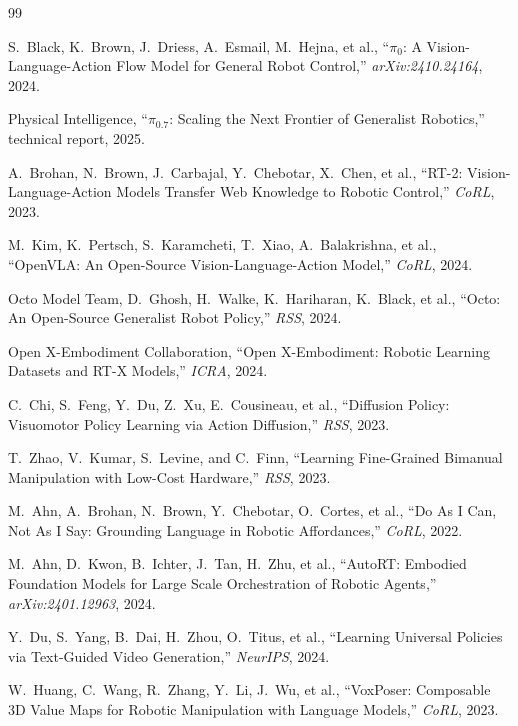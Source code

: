\documentclass[11pt,a4paper]{article}
\begin{document}
\begin{thebibliography}{99}

 S.~Black, K.~Brown, J.~Driess, A.~Esmail, M.~Hejna, et al.,
``$\pi_0$: A Vision-Language-Action Flow Model for General Robot Control,''
\emph{arXiv:2410.24164}, 2024.

 Physical Intelligence, ``$\pi_0.7$: Scaling the Next Frontier of
Generalist Robotics,'' technical report, 2025.

 A.~Brohan, N.~Brown, J.~Carbajal, Y.~Chebotar, X.~Chen, et al.,
``RT-2: Vision-Language-Action Models Transfer Web Knowledge to Robotic
Control,'' \emph{CoRL}, 2023.

 M.~Kim, K.~Pertsch, S.~Karamcheti, T.~Xiao, A.~Balakrishna,
et al., ``OpenVLA: An Open-Source Vision-Language-Action Model,'' \emph{CoRL},
2024.

 Octo Model Team, D.~Ghosh, H.~Walke, K.~Hariharan, K.~Black,
et al., ``Octo: An Open-Source Generalist Robot Policy,'' \emph{RSS}, 2024.

 Open X-Embodiment Collaboration, ``Open X-Embodiment: Robotic
Learning Datasets and RT-X Models,'' \emph{ICRA}, 2024.

 C.~Chi, S.~Feng, Y.~Du, Z.~Xu, E.~Cousineau, et al.,
``Diffusion Policy: Visuomotor Policy Learning via Action Diffusion,''
\emph{RSS}, 2023.

 T.~Zhao, V.~Kumar, S.~Levine, and C.~Finn, ``Learning Fine-Grained
Bimanual Manipulation with Low-Cost Hardware,'' \emph{RSS}, 2023.

 M.~Ahn, A.~Brohan, N.~Brown, Y.~Chebotar, O.~Cortes, et al.,
``Do As I Can, Not As I Say: Grounding Language in Robotic Affordances,''
\emph{CoRL}, 2022.

 M.~Ahn, D.~Kwon, B.~Ichter, J.~Tan, H.~Zhu, et al., ``AutoRT:
Embodied Foundation Models for Large Scale Orchestration of Robotic Agents,''
\emph{arXiv:2401.12963}, 2024.

 Y.~Du, S.~Yang, B.~Dai, H.~Zhou, O.~Titus, et al., ``Learning
Universal Policies via Text-Guided Video Generation,'' \emph{NeurIPS}, 2024.

 W.~Huang, C.~Wang, R.~Zhang, Y.~Li, J.~Wu, et al.,
``VoxPoser: Composable 3D Value Maps for Robotic Manipulation with Language
Models,'' \emph{CoRL}, 2023.


\end{thebibliography}
\end{document}
